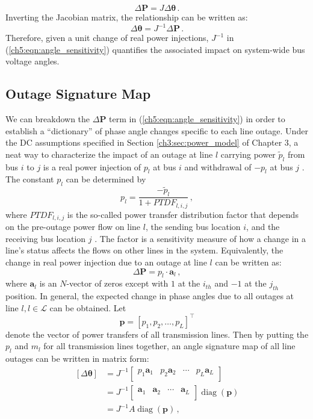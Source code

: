$$
\Delta\textbf{P} = {J} \Delta\boldsymbol{\theta} \,.
$$
Inverting the Jacobian matrix, the relationship can be written as:
\begin{equation}
\label{ch5:eqn:angle_sensitivity}
\Delta\boldsymbol{\theta}  = {J}^{-1} \Delta\textbf{P} \,.
\end{equation}
Therefore, given a unit change of real power injections, ${J}^{-1}$ in (\ref{ch5:eqn:angle_sensitivity}) quantifies the associated impact on system-wide bus voltage angles. 

\subsection{Outage Signature Map}
We can breakdown the $\Delta\textbf{P}$ term in (\ref{ch5:eqn:angle_sensitivity}) in order to establish a ``dictionary'' of phase angle changes specific to each line outage. Under the DC assumptions specified in Section \ref{ch3:sec:power_model} of Chapter 3, a neat way to characterize the impact of an outage at line $l$ carrying power $\tilde{p}_l$ from bus $i$ to $j$ is a real power injection of $p_{l}$ at bus $i$ and withdrawal of $-p_{l}$ at bus $j$ \cite{wood2013power}. The constant $p_l$ can be determined by
$$
p_l = \frac{-\tilde{p}_l}{1+PTDF_{l, i, j}} \,,
$$ where $PTDF_{l, i, j}$ is the so-called power transfer distribution factor that depends on the pre-outage power flow on line $l$, the sending bus location $i$, and the receiving bus location $j$ \cite{liu2004role}. The factor is a sensitivity measure of how a change in a line’s status affects the flows on other lines in the system. Equivalently, the change in real power injection due to an outage at line $l$ can be written as:
$$
\Delta \textbf{P} = p_{l} \cdot \mathbf{a}_l \,,
$$ 
where $\mathbf{a}_l$ is an $N$-vector of zeros except with $1$ at the $i_{th}$ and $-1$ at the $j_{th}$ position. In general, the expected change in phase angles due to all outages at line $l, l \in \mathcal{L}$ can be obtained. Let 
$$
\boldsymbol{p} = [p_1, p_2, \dots, p_L]^{\top}
$$
denote the vector of power transfers of all transmission lines. Then by putting the $p_{l}$ and $m_l$ for all transmission lines together, an angle signature map of all line outages can be written in matrix form:
\begin{align}
\label{ch5:eqn:complete_map}
    [\Delta\boldsymbol{\theta}] 
    &= {J}^{-1} 
    \begin{bmatrix} p_{1} \mathbf{a}_{1} & p_{2} \mathbf{a}_{2} & \cdots & p_{L} \mathbf{a}_{L}\\ 
    \end{bmatrix} \nonumber\\ 
    &= {J}^{-1} 
    \begin{bmatrix} \mathbf{a}_{1} & \mathbf{a}_{2} & \cdots & \mathbf{a}_{L} \\
    \end{bmatrix} \operatorname{ diag}(\boldsymbol{p}) \nonumber\\
    &= {J}^{-1} A \operatorname{ diag}(\boldsymbol{p}) \,, 
\end{align}
